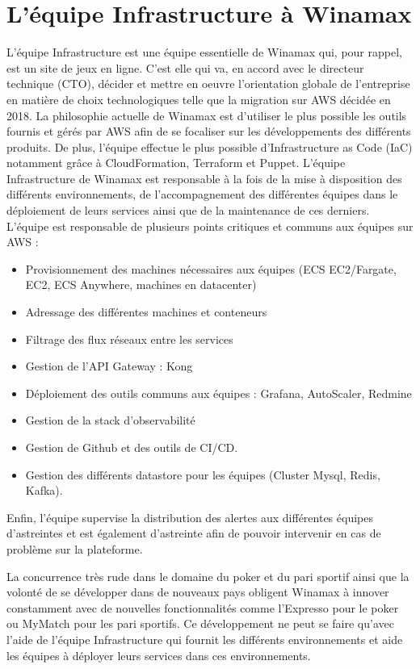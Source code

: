 \section{L'équipe Infrastructure à Winamax}

L’équipe Infrastructure est une équipe essentielle de Winamax qui, pour
rappel, est un site de jeux en ligne. C’est elle qui va, en accord avec le directeur
technique (CTO), décider et mettre en oeuvre l’orientation globale de l’entreprise
en matière de choix technologiques telle que la migration sur AWS décidée en 2018.
La philosophie actuelle de Winamax est d’utiliser le plus possible les outils fournis
et gérés par AWS afin de se focaliser sur les développements des différents produits.
De plus, l’équipe effectue le plus possible d’Infrastructure as Code (IaC) notamment
grâce à CloudFormation, Terraform et Puppet.
L’équipe Infrastructure de Winamax est responsable à la fois de la mise
à disposition des différents environnements, de l’accompagnement des différentes
équipes dans le déploiement de leurs services ainsi que de la maintenance de ces
derniers.
L’équipe est responsable de plusieurs points critiques et communs aux équipes
sur AWS :
\begin{itemize}
\item Provisionnement des machines nécessaires aux équipes (ECS EC2/Fargate,
EC2, ECS Anywhere, machines en datacenter)
\item Adressage des différentes machines et conteneurs
\item Filtrage des flux réseaux entre les services
\item Gestion de l’API Gateway : Kong
\item Déploiement des outils communs aux équipes : Grafana, AutoScaler, Redmine
\item Gestion de la stack d’observabilité
\item Gestion de Github et des outils de CI/CD.
\item Gestion des différents datastore pour les équipes (Cluster Mysql, Redis, Kafka).
\end{itemize}

Enfin, l’équipe supervise la distribution des alertes aux différentes équipes
d’astreintes et est également d’astreinte afin de pouvoir intervenir en cas de problème
sur la plateforme.

La concurrence très rude dans le domaine du poker et du pari sportif ainsi
que la volonté de se développer dans de nouveaux pays obligent Winamax à innover
constamment avec de nouvelles fonctionnalités comme l’Expresso pour le poker ou
MyMatch pour les pari sportifs. Ce développement ne peut se faire qu’avec l’aide de
l’équipe Infrastructure qui fournit les différents environnements et aide les équipes
à déployer leurs services dans ces environnements.



